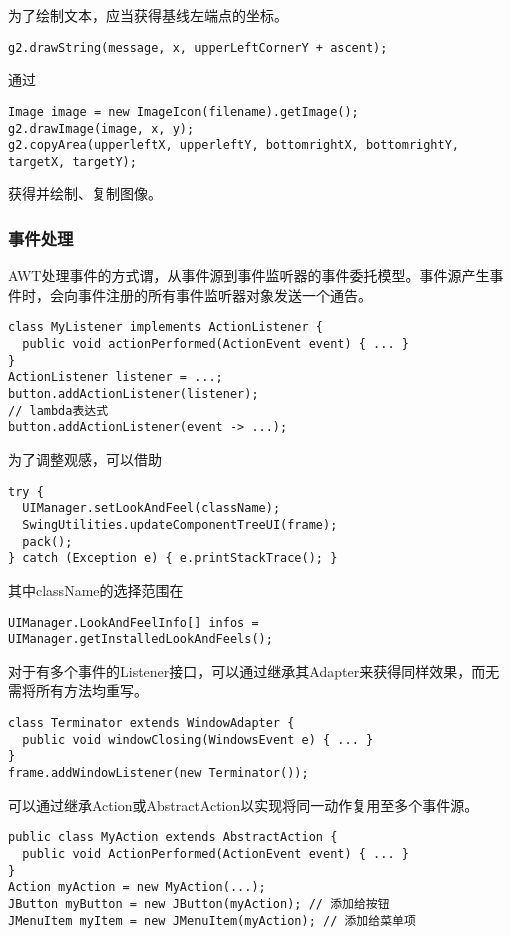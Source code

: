 \documentclass{ctexart}
\begin{document}
\par
为了绘制文本，应当获得基线左端点的坐标。
\begin{lstlisting}
g2.drawString(message, x, upperLeftCornerY + ascent);
\end{lstlisting}
\par
通过
\begin{lstlisting}
Image image = new ImageIcon(filename).getImage();
g2.drawImage(image, x, y);
g2.copyArea(upperleftX, upperleftY, bottomrightX, bottomrightY, targetX, targetY);
\end{lstlisting}
获得并绘制、复制图像。
\subsubsection*{事件处理}
AWT处理事件的方式谓，从事件源到事件监听器的事件委托模型。事件源产生事件时，会向事件注册的所有事件监听器对象发送一个通告。
\begin{lstlisting}
class MyListener implements ActionListener {
  public void actionPerformed(ActionEvent event) { ... }
}
ActionListener listener = ...;
button.addActionListener(listener);
// lambda表达式
button.addActionListener(event -> ...);
\end{lstlisting}
\par
为了调整观感，可以借助
\begin{lstlisting}
try {
  UIManager.setLookAndFeel(className);
  SwingUtilities.updateComponentTreeUI(frame);
  pack();
} catch (Exception e) { e.printStackTrace(); }
\end{lstlisting}
其中className的选择范围在
\begin{lstlisting}
UIManager.LookAndFeelInfo[] infos = UIManager.getInstalledLookAndFeels();
\end{lstlisting}
\par
对于有多个事件的Listener接口，可以通过继承其Adapter来获得同样效果，而无需将所有方法均重写。
\begin{lstlisting}
class Terminator extends WindowAdapter {
  public void windowClosing(WindowsEvent e) { ... }
}
frame.addWindowListener(new Terminator());
\end{lstlisting}
\par
可以通过继承Action或AbstractAction以实现将同一动作复用至多个事件源。
\begin{lstlisting}
public class MyAction extends AbstractAction {
  public void ActionPerformed(ActionEvent event) { ... }
}
Action myAction = new MyAction(...);
JButton myButton = new JButton(myAction); // 添加给按钮
JMenuItem myItem = new JMenuItem(myAction); // 添加给菜单项

\end{lstlisting}
\end{document}
